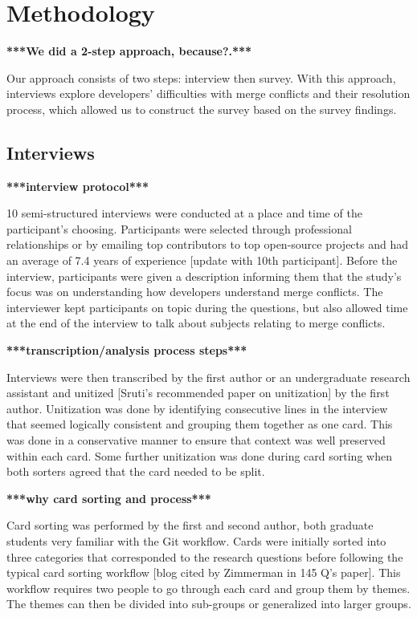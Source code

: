 \section{Methodology}
\textbf{***We did a 2-step approach, because?.***}

Our approach consists of two steps: interview then survey. With this approach, interviews explore developers' difficulties with merge conflicts and their resolution process, which allowed us to construct the survey based on the survey findings.

\subsection{Interviews}
\textbf{***interview protocol***}

10 semi-structured interviews were conducted at a place and time of the participant's choosing. Participants were selected through professional relationships or by emailing top contributors to top open-source projects and had an average of 7.4 years of experience [update with 10th participant]. Before the interview, participants were given a description informing them that the study's focus was on understanding how developers understand merge conflicts. The interviewer kept participants on topic during the questions, but also allowed time at the end of the interview to talk about subjects relating to merge conflicts. 

\textbf{***transcription/analysis process steps***}

Interviews were then transcribed by the first author or an undergraduate research assistant and unitized [Sruti's recommended paper on unitization] by the first author. Unitization was done by identifying consecutive lines in the interview that seemed logically consistent and grouping them together as one card. This was done in a conservative manner to ensure that context was well preserved within each card. Some further unitization was done during card sorting when both sorters agreed that the card needed to be split.

\textbf{***why card sorting and process***}

Card sorting was performed by the first and second author, both graduate students very familiar with the Git workflow. Cards were initially sorted into three categories that corresponded to the research questions before following the typical card sorting workflow [blog cited by Zimmerman in 145 Q's paper]. This workflow requires two people to go through each card and group them by themes. The themes can then be divided into sub-groups or generalized into larger groups.

